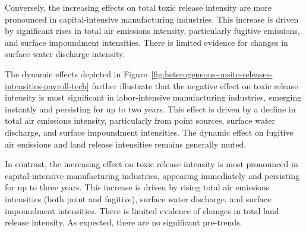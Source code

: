 \documentclass[12pt, english]{article}
\begin{document}
    Conversely, the increasing effects on total toxic release intensity are more pronounced in capital-intensive manufacturing industries. This increase is driven by significant rises in total air emissions intensity, particularly fugitive emissions, and surface impoundment intensities. There is limited evidence for changes in surface water discharge intensity.

    The dynamic effects depicted in Figure~\ref{fig:heterogeneous-onsite-releases-intensities-payroll-tech} further illustrate that the negative effect on toxic release intensity is most significant in labor-intensive manufacturing industries, emerging instantly and persisting for up to two years. This effect is driven by a decline in total air emissions intensity, particularly from point sources, surface water discharge, and surface impoundment intensities. The dynamic effect on fugitive air emissions and land release intensities remains generally muted.
    

    In contrast, the increasing effect on toxic release intensity is most pronounced in capital-intensive manufacturing industries, appearing immediately and persisting for up to three years. This increase is driven by rising total air emissions intensities (both point and fugitive), surface water discharge, and surface impoundment intensities. There is limited evidence of changes in total land release intensity. As expected, there are no significant pre-trends.
\end{document}
